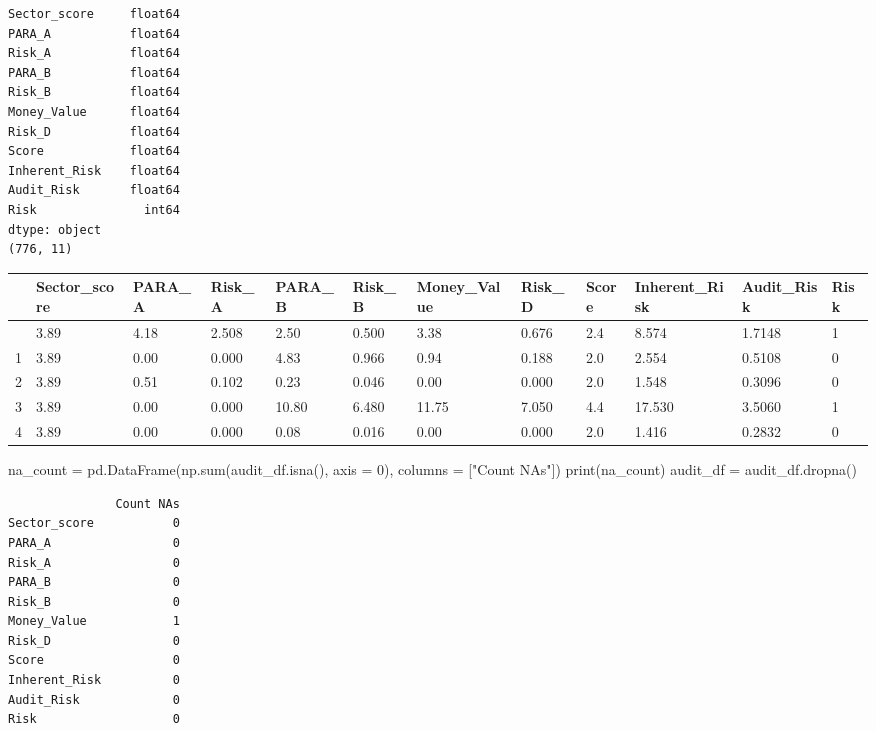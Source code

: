 \documentclass[
  11pt,
  letterpaper,
  DIV=11,
  numbers=noendperiod]{scrartcl}
\newenvironment{Shaded}{\begin{snugshade}}{\end{snugshade}}
\newcommand{\BuiltInTok}[1]{\textcolor[rgb]{0.00,0.23,0.31}{#1}}
\newcommand{\DecValTok}[1]{\textcolor[rgb]{0.68,0.00,0.00}{#1}}
\newcommand{\NormalTok}[1]{\textcolor[rgb]{0.00,0.23,0.31}{#1}}
\newcommand{\OperatorTok}[1]{\textcolor[rgb]{0.37,0.37,0.37}{#1}}
\newcommand{\StringTok}[1]{\textcolor[rgb]{0.13,0.47,0.30}{#1}}
\begin{document}
\begin{verbatim}
Sector_score     float64
PARA_A           float64
Risk_A           float64
PARA_B           float64
Risk_B           float64
Money_Value      float64
Risk_D           float64
Score            float64
Inherent_Risk    float64
Audit_Risk       float64
Risk               int64
dtype: object
(776, 11)
\end{verbatim}

\begin{longtable}[]{@{}llllllllllll@{}}
\toprule\noalign{}
& Sector\_score & PARA\_A & Risk\_A & PARA\_B & Risk\_B & Money\_Value &
Risk\_D & Score & Inherent\_Risk & Audit\_Risk & Risk \\
\midrule\noalign{}
\endhead
\bottomrule\noalign{}
\endlastfoot
0 & 3.89 & 4.18 & 2.508 & 2.50 & 0.500 & 3.38 & 0.676 & 2.4 & 8.574 &
1.7148 & 1 \\
1 & 3.89 & 0.00 & 0.000 & 4.83 & 0.966 & 0.94 & 0.188 & 2.0 & 2.554 &
0.5108 & 0 \\
2 & 3.89 & 0.51 & 0.102 & 0.23 & 0.046 & 0.00 & 0.000 & 2.0 & 1.548 &
0.3096 & 0 \\
3 & 3.89 & 0.00 & 0.000 & 10.80 & 6.480 & 11.75 & 7.050 & 4.4 & 17.530 &
3.5060 & 1 \\
4 & 3.89 & 0.00 & 0.000 & 0.08 & 0.016 & 0.00 & 0.000 & 2.0 & 1.416 &
0.2832 & 0 \\
\end{longtable}

\begin{Shaded}
\begin{Highlighting}[]
\NormalTok{na\_count }\OperatorTok{=}\NormalTok{ pd.DataFrame(np.}\BuiltInTok{sum}\NormalTok{(audit\_df.isna(), axis }\OperatorTok{=} \DecValTok{0}\NormalTok{), columns }\OperatorTok{=}\NormalTok{ [}\StringTok{"Count NAs"}\NormalTok{])}
\BuiltInTok{print}\NormalTok{(na\_count)}
\NormalTok{audit\_df }\OperatorTok{=}\NormalTok{ audit\_df.dropna()}
\end{Highlighting}
\end{Shaded}

\begin{verbatim}
               Count NAs
Sector_score           0
PARA_A                 0
Risk_A                 0
PARA_B                 0
Risk_B                 0
Money_Value            1
Risk_D                 0
Score                  0
Inherent_Risk          0
Audit_Risk             0
Risk                   0
\end{verbatim}
\end{document}
